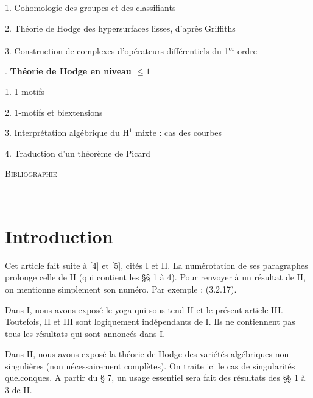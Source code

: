 \documentclass[11pt,leqno]{article}
\newcommand{\Page}[1]{\ifvmode\noindent\else\unskip\ \fi{\footnotesize\textcolor{gray}{[p.\,#1]}}\ \ignorespaces}
\begin{document}
\noindent\hspace*{1.5em}1. Cohomologie des groupes et des classifiants\par
\noindent\hspace*{1.5em}2. Théorie de Hodge des hypersurfaces lisses, d’après Griffiths\par
\noindent\hspace*{1.5em}3. Construction de complexes d’opérateurs différentiels du 1\textsuperscript{er} ordre\par
\medskip
{}. \textbf{\boldmath Théorie de Hodge en niveau \(\leq 1\)}\par
\noindent\hspace*{1.5em}1. 1-motifs\par
\noindent\hspace*{1.5em}2. 1-motifs et biextensions\par
\noindent\hspace*{1.5em}3. Interprétation algébrique du \(\mathrm{H}^{1}\) mixte : cas des courbes\par
\noindent\hspace*{1.5em}4. Traduction d’un théorème de Picard\par
\medskip
\noindent\textsc{Bibliographie}\par
\endgroup

\Page{6}

\section*{\centering Introduction}

Cet article fait suite à [4] et [5], cités I et II. La numérotation de ses paragraphes prolonge celle de II (qui contient les §§ 1 à 4). Pour renvoyer à un résultat de II, on mentionne simplement son numéro. Par exemple : (3.2.17).

Dans I, nous avons exposé le yoga qui sous-tend II et le présent article III. Toutefois, II et III sont logiquement indépendants de I. Ils ne contiennent pas tous les résultats qui sont annoncés dans I.

Dans II, nous avons exposé la théorie de Hodge des variétés algébriques non singulières (non nécessairement complètes). On traite ici le cas de singularités quelconques. A partir du § 7, un usage essentiel sera fait des résultats des §§ 1 à 3 de II.
\end{document}
